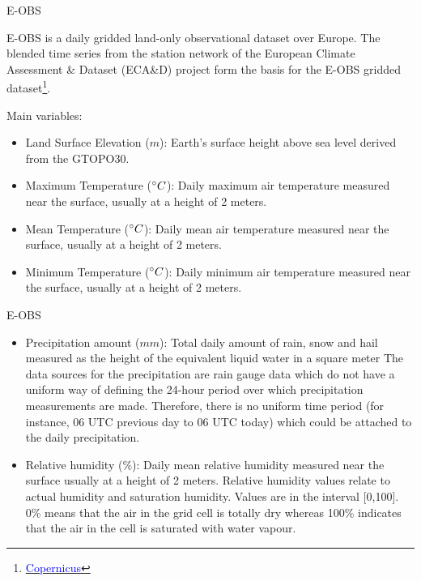 \documentclass[xcolor={dvipsnames}]{beamer}
\begin{document}
\begin{frame}{E-OBS}

E-OBS is a daily gridded land-only observational dataset over Europe. The blended time series from the station network of the European Climate Assessment \& Dataset (ECA\&D) project form the basis for the E-OBS gridded dataset\footnote{\href{https://cds.climate.copernicus.eu/cdsapp#!/dataset/insitu-gridded-observations-europe?tab=overview}{\textcolor{blue}{Copernicus}}}.

\pause

\hfill

Main variables:
\begin{itemize}
    \item Land Surface Elevation ($m$): Earth's surface height above sea level derived from the GTOPO30.
    \item Maximum Temperature ($\degree C$): Daily maximum air temperature measured near the surface, usually at a height of 2 meters.
    \item Mean Temperature ($\degree C$): Daily mean air temperature measured near the surface, usually at a height of 2 meters.
    \item Minimum Temperature ($\degree C$): Daily minimum air temperature measured near the surface, usually at a height of 2 meters.
\end{itemize}

\end{frame}

\begin{frame}{E-OBS}

\begin{itemize}
    \item Precipitation amount ($mm$): Total daily amount of rain, snow and hail measured as the height of the equivalent liquid water in a square meter The data sources for the precipitation are rain gauge data which do not have a uniform way of defining the 24-hour period over which precipitation measurements are made. Therefore, there is no uniform time period (for instance, 06 UTC previous day to 06 UTC today) which could be attached to the daily precipitation.
    \item Relative humidity ($\%$): Daily mean relative humidity measured near the surface usually at a height of 2 meters. Relative humidity values relate to actual humidity and saturation humidity. Values are in the interval [0,100]. 0\% means that the air in the grid cell is totally dry whereas 100\% indicates that the air in the cell is saturated with water vapour.
\end{itemize}
    
\end{frame}
\end{document}
